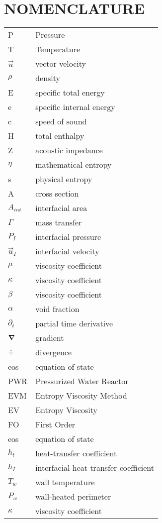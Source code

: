 %
%
%


\chapter*{NOMENCLATURE}

\begin{longtable}{l l }
P & Pressure\tabularnewline
T & Temperature\tabularnewline
$\vec{u}$ & vector velocity \tabularnewline
$\rho$ & density \tabularnewline
E & specific total energy \tabularnewline
e & specific internal energy \tabularnewline
c & speed of sound \tabularnewline
H & total enthalpy \tabularnewline
Z & acoustic impedance \tabularnewline
$\eta$ & mathematical entropy \tabularnewline
s & physical entropy \tabularnewline
A & cross section \tabularnewline
$A_{int}$ & interfacial area \tabularnewline
$\Gamma$ & mass transfer \tabularnewline
$P_I$ & interfacial pressure \tabularnewline
$\vec{u}_I$ & interfacial velocity \tabularnewline
$\mu$ & viscosity coefficient \tabularnewline
$\kappa$ & viscosity coefficient \tabularnewline
$\beta$ & viscosity coefficient \tabularnewline
$\alpha$ & void fraction \tabularnewline
$\partial_t$ & partial time derivative \tabularnewline
$\boldsymbol{\nabla}$ & gradient \tabularnewline
$\div$ & divergence \tabularnewline
eos & equation of state \tabularnewline
PWR & Pressurized Water Reactor \tabularnewline
EVM & Entropy Viscosity Method \tabularnewline
EV & Entropy Viscosity\tabularnewline
FO & First Order \tabularnewline
eos & equation of state \tabularnewline
$h_t$ &  heat-transfer coefficient\tabularnewline
$h_I$ & interfacial heat-transfer coefficient \tabularnewline
$T_w$ & wall temperature \tabularnewline
$P_w$ & wall-heated perimeter \tabularnewline
$\kappa$ & viscosity coefficient \tabularnewline
\end{longtable}

\vspace{2em}
\pagebreak{}